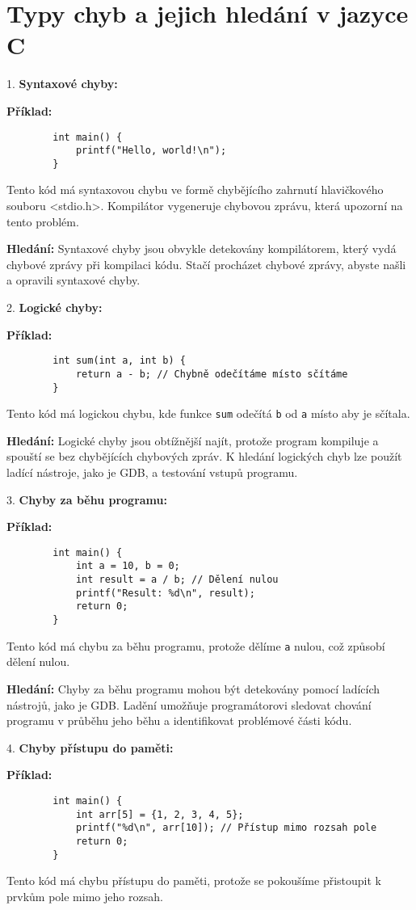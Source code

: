 \documentclass{article}
\begin{document}
	
	\section*{Typy chyb a jejich hledání v jazyce C}
	
	1. \textbf{Syntaxové chyby:}
	
	\textbf{Příklad:}
	\begin{verbatim}
		int main() {
			printf("Hello, world!\n");
		}
	\end{verbatim}
	Tento kód má syntaxovou chybu ve formě chybějícího zahrnutí hlavičkového souboru <stdio.h>. Kompilátor vygeneruje chybovou zprávu, která upozorní na tento problém.
	
	\textbf{Hledání:} Syntaxové chyby jsou obvykle detekovány kompilátorem, který vydá chybové zprávy při kompilaci kódu. Stačí procházet chybové zprávy, abyste našli a opravili syntaxové chyby.
	
	2. \textbf{Logické chyby:}
	
	\textbf{Příklad:}
	\begin{verbatim}
		int sum(int a, int b) {
			return a - b; // Chybně odečítáme místo sčítáme
		}
	\end{verbatim}
	Tento kód má logickou chybu, kde funkce \texttt{sum} odečítá \texttt{b} od \texttt{a} místo aby je sčítala.
	
	\textbf{Hledání:} Logické chyby jsou obtížnější najít, protože program kompiluje a spouští se bez chybějících chybových zpráv. K hledání logických chyb lze použít ladící nástroje, jako je GDB, a testování vstupů programu.
	
	3. \textbf{Chyby za běhu programu:}
	
	\textbf{Příklad:}
	\begin{verbatim}
		int main() {
			int a = 10, b = 0;
			int result = a / b; // Dělení nulou
			printf("Result: %d\n", result);
			return 0;
		}
	\end{verbatim}
	Tento kód má chybu za běhu programu, protože dělíme \texttt{a} nulou, což způsobí dělení nulou.
	
	\textbf{Hledání:} Chyby za běhu programu mohou být detekovány pomocí ladících nástrojů, jako je GDB. Ladění umožňuje programátorovi sledovat chování programu v průběhu jeho běhu a identifikovat problémové části kódu.
	
	4. \textbf{Chyby přístupu do paměti:}
	
	\textbf{Příklad:}
	\begin{verbatim}
		int main() {
			int arr[5] = {1, 2, 3, 4, 5};
			printf("%d\n", arr[10]); // Přístup mimo rozsah pole
			return 0;
		}
	\end{verbatim}
	Tento kód má chybu přístupu do paměti, protože se pokoušíme přistoupit k prvkům pole mimo jeho rozsah.
	
\end{document}

